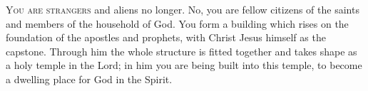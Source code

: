 
\lettrine{Y}{ou are strangers} and aliens no longer. No, you are fellow citizens of the saints and members of the household of God. You form a building which rises on the foundation of the apostles and prophets, with Christ Jesus himself as the capstone. Through him the whole structure is fitted together and takes shape as a holy temple in the Lord; in him you are being built into this temple, to become a dwelling place for God in the Spirit.
